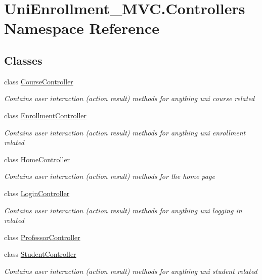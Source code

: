 \hypertarget{namespace_uni_enrollment___m_v_c_1_1_controllers}{}\section{Uni\+Enrollment\+\_\+\+M\+V\+C.\+Controllers Namespace Reference}
\label{namespace_uni_enrollment___m_v_c_1_1_controllers}
\subsection*{Classes}
\begin{DoxyCompactItemize}
\item 
class \hyperlink{class_uni_enrollment___m_v_c_1_1_controllers_1_1_course_controller}{Course\+Controller}
\begin{DoxyCompactList}\small\item\em Contains user interaction (action result) methods for anything uni \textquotesingle{}course\textquotesingle{} related \end{DoxyCompactList}\item 
class \hyperlink{class_uni_enrollment___m_v_c_1_1_controllers_1_1_enrollment_controller}{Enrollment\+Controller}
\begin{DoxyCompactList}\small\item\em Contains user interaction (action result) methods for anything uni \textquotesingle{}enrollment\textquotesingle{} related \end{DoxyCompactList}\item 
class \hyperlink{class_uni_enrollment___m_v_c_1_1_controllers_1_1_home_controller}{Home\+Controller}
\begin{DoxyCompactList}\small\item\em Contains user interaction (action result) methods for the home page \end{DoxyCompactList}\item 
class \hyperlink{class_uni_enrollment___m_v_c_1_1_controllers_1_1_login_controller}{Login\+Controller}
\begin{DoxyCompactList}\small\item\em Contains user interaction (action result) methods for anything uni \textquotesingle{}logging in\textquotesingle{} related \end{DoxyCompactList}\item 
class \hyperlink{class_uni_enrollment___m_v_c_1_1_controllers_1_1_professor_controller}{Professor\+Controller}
\item 
class \hyperlink{class_uni_enrollment___m_v_c_1_1_controllers_1_1_student_controller}{Student\+Controller}
\begin{DoxyCompactList}\small\item\em Contains user interaction (action result) methods for anything uni \textquotesingle{}student\textquotesingle{} related \end{DoxyCompactList}\end{DoxyCompactItemize}

